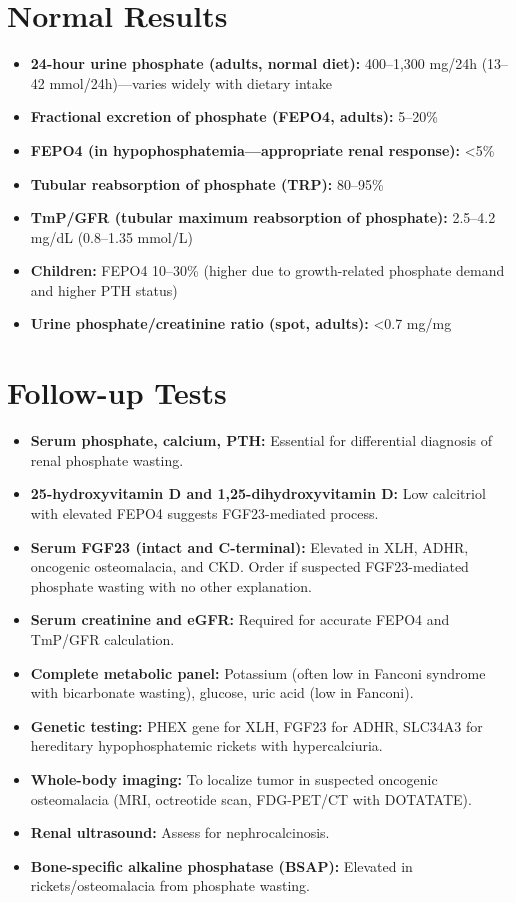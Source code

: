 \section*{Normal Results}
\begin{itemize}
  \item \textbf{24-hour urine phosphate (adults, normal diet):} 400--1,300 mg/24h (13--42 mmol/24h)---varies widely with dietary intake
  \item \textbf{Fractional excretion of phosphate (FEPO4, adults):} 5--20\%
  \item \textbf{FEPO4 (in hypophosphatemia---appropriate renal response):} <5\%
  \item \textbf{Tubular reabsorption of phosphate (TRP):} 80--95\%
  \item \textbf{TmP/GFR (tubular maximum reabsorption of phosphate):} 2.5--4.2 mg/dL (0.8--1.35 mmol/L)
  \item \textbf{Children:} FEPO4 10--30\% (higher due to growth-related phosphate demand and higher PTH status)
  \item \textbf{Urine phosphate/creatinine ratio (spot, adults):} <0.7 mg/mg
\end{itemize}

\section*{Follow-up Tests}
\begin{itemize}
  \item \textbf{Serum phosphate, calcium, PTH:} Essential for differential diagnosis of renal phosphate wasting.
  \item \textbf{25-hydroxyvitamin D and 1,25-dihydroxyvitamin D:} Low calcitriol with elevated FEPO4 suggests FGF23-mediated process.
  \item \textbf{Serum FGF23 (intact and C-terminal):} Elevated in XLH, ADHR, oncogenic osteomalacia, and CKD. Order if suspected FGF23-mediated phosphate wasting with no other explanation.
  \item \textbf{Serum creatinine and eGFR:} Required for accurate FEPO4 and TmP/GFR calculation.
  \item \textbf{Complete metabolic panel:} Potassium (often low in Fanconi syndrome with bicarbonate wasting), glucose, uric acid (low in Fanconi).
  \item \textbf{Genetic testing:} PHEX gene for XLH, FGF23 for ADHR, SLC34A3 for hereditary hypophosphatemic rickets with hypercalciuria.
  \item \textbf{Whole-body imaging:} To localize tumor in suspected oncogenic osteomalacia (MRI, octreotide scan, FDG-PET/CT with DOTATATE).
  \item \textbf{Renal ultrasound:} Assess for nephrocalcinosis.
  \item \textbf{Bone-specific alkaline phosphatase (BSAP):} Elevated in rickets/osteomalacia from phosphate wasting.
\end{itemize}


